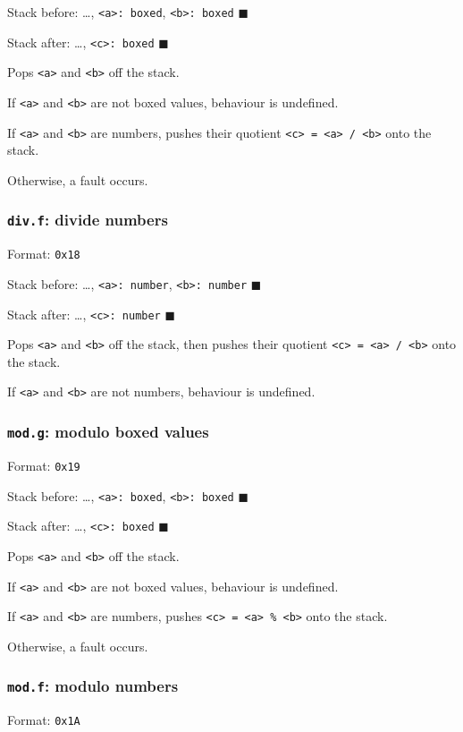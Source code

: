 Stack before: \ldots{}, \texttt{<a>: boxed}, \texttt{<b>: boxed} \(\blacksquare\)

Stack after: \ldots{}, \texttt{<c>: boxed} \(\blacksquare\)

Pops \texttt{<a>} and \texttt{<b>} off the stack.

If \texttt{<a>} and \texttt{<b>} are not boxed values, behaviour is undefined.

If \texttt{<a>} and \texttt{<b>} are numbers, pushes their quotient \texttt{<c> = <a> / <b>}
onto the stack.

Otherwise, a fault occurs.

\subsubsection{\texttt{div.f}: divide numbers}
\label{sec:org9ea386e}
Format: \texttt{0x18}

Stack before: \ldots{}, \texttt{<a>: number}, \texttt{<b>: number} \(\blacksquare\)

Stack after: \ldots{}, \texttt{<c>: number} \(\blacksquare\)

Pops \texttt{<a>} and \texttt{<b>} off the stack, then pushes their quotient
\texttt{<c> = <a> / <b>} onto the stack.

If \texttt{<a>} and \texttt{<b>} are not numbers, behaviour is undefined.

\subsubsection{\texttt{mod.g}: modulo boxed values}
\label{sec:org6afbbf6}
Format: \texttt{0x19}

Stack before: \ldots{}, \texttt{<a>: boxed}, \texttt{<b>: boxed} \(\blacksquare\)

Stack after: \ldots{}, \texttt{<c>: boxed} \(\blacksquare\)

Pops \texttt{<a>} and \texttt{<b>} off the stack.

If \texttt{<a>} and \texttt{<b>} are not boxed values, behaviour is undefined.

If \texttt{<a>} and \texttt{<b>} are numbers, pushes \texttt{<c> = <a> \% <b>} onto the stack.

Otherwise, a fault occurs.

\subsubsection{\texttt{mod.f}: modulo numbers}
\label{sec:orgf4bf035}
Format: \texttt{0x1A}


